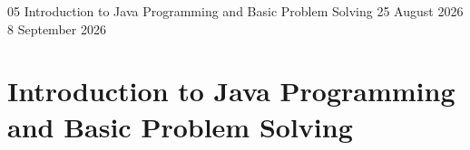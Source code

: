 \GenerateCoverPage
{05} %
{Introduction to Java Programming and Basic Problem Solving} %
{25 August 2026} %
{8 September 2026} %

\noindent
\chapter{Introduction to Java Programming and Basic Problem Solving}







\setcounter{section}{0}

